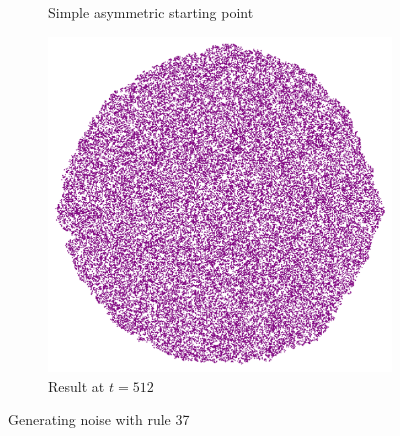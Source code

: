 \documentclass{article}
\begin{document}
\begin{figure}[H]
    \centering
    \begin{subfigure}[t]{0.39\textwidth}
        \centering
        \caption{Simple asymmetric starting point}
    \end{subfigure}
    \begin{subfigure}[t]{0.6\textwidth}
        \centering
        \includegraphics[width=\textwidth]{graphics/behavior/noise/rule-37-time-512-asymmetric.pdf}
        \caption{Result at $t=512$}
        \label{fig:rule-37-time-512-asymmetric}
    \end{subfigure}
    \caption{Generating noise with rule 37}
    \label{fig:noise}
\end{figure}
\end{document}
